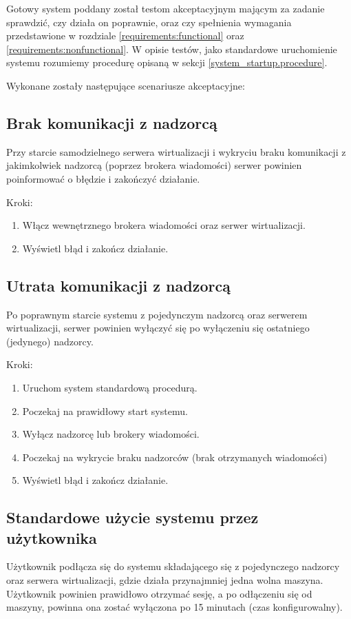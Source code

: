 \documentclass[../analiza-rozwiazania.tex]{subfiles}
\begin{document}
Gotowy system poddany został testom akceptacyjnym mającym za zadanie sprawdzić, czy działa on poprawnie, oraz czy spełnienia wymagania przedstawione w rozdziale \ref{requirements:functional} oraz \ref{requirements:nonfunctional}.
W opisie testów, jako standardowe uruchomienie systemu rozumiemy procedurę opisaną w sekcji \ref{system_startup.procedure}.

Wykonane zostały następujące scenariusze akceptacyjne:

\subsection{Brak komunikacji z nadzorcą}
Przy starcie samodzielnego serwera wirtualizacji i wykryciu braku komunikacji z jakimkolwiek nadzorcą (poprzez brokera wiadomości) serwer powinien poinformować o błędzie i zakończyć działanie.

Kroki:
\begin{enumerate}
  \item Włącz wewnętrznego brokera wiadomości oraz serwer wirtualizacji.
  \item Wyświetl błąd i zakończ działanie.
\end{enumerate}

\subsection{Utrata komunikacji z nadzorcą}
Po poprawnym starcie systemu z pojedynczym nadzorcą oraz serwerem wirtualizacji, serwer powinien wyłączyć się po wyłączeniu się ostatniego (jedynego) nadzorcy.

Kroki:
\begin{enumerate}
  \item Uruchom system standardową procedurą.
  \item Poczekaj na prawidłowy start systemu.
  \item Wyłącz nadzorcę lub brokery wiadomości.
  \item Poczekaj na wykrycie braku nadzorców (brak otrzymanych wiadomości)
  \item Wyświetl błąd i zakończ działanie.
\end{enumerate}

\subsection{Standardowe użycie systemu przez użytkownika}
Użytkownik podłącza się do systemu składającego się z pojedynczego nadzorcy oraz serwera wirtualizacji, gdzie działa przynajmniej jedna wolna maszyna.
Użytkownik powinien prawidłowo otrzymać sesję, a po odłączeniu się od maszyny, powinna ona zostać wyłączona po 15 minutach (czas konfigurowalny).
\end{document}
